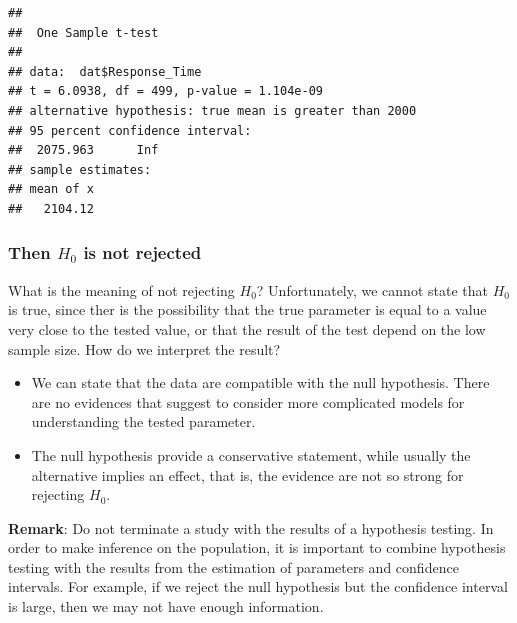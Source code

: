 \documentclass[
]{article}
\newenvironment{Shaded}{\begin{snugshade}}{\end{snugshade}}
\newcommand{\AttributeTok}[1]{\textcolor[rgb]{0.13,0.29,0.53}{#1}}
\newcommand{\DecValTok}[1]{\textcolor[rgb]{0.00,0.00,0.81}{#1}}
\newcommand{\FunctionTok}[1]{\textcolor[rgb]{0.13,0.29,0.53}{\textbf{#1}}}
\newcommand{\NormalTok}[1]{#1}
\newcommand{\SpecialCharTok}[1]{\textcolor[rgb]{0.81,0.36,0.00}{\textbf{#1}}}
\newcommand{\StringTok}[1]{\textcolor[rgb]{0.31,0.60,0.02}{#1}}
\providecommand{\tightlist}{%
  \setlength{\itemsep}{0pt}\setlength{\parskip}{0pt}}
\begin{document}
\begin{Shaded}
\end{Shaded}

\begin{verbatim}
## 
##  One Sample t-test
## 
## data:  dat$Response_Time
## t = 6.0938, df = 499, p-value = 1.104e-09
## alternative hypothesis: true mean is greater than 2000
## 95 percent confidence interval:
##  2075.963      Inf
## sample estimates:
## mean of x 
##   2104.12
\end{verbatim}

\hypertarget{then-h_0-is-not-rejected}{%
\subsubsection{\texorpdfstring{Then \(H_0\) is not
rejected}{Then H\_0 is not rejected}}\label{then-h_0-is-not-rejected}}

What is the meaning of not rejecting \(H_0\)? Unfortunately, we cannot
state that \(H_0\) is true, since ther is the possibility that the true
parameter is equal to a value very close to the tested value, or that
the result of the test depend on the low sample size. How do we
interpret the result?

\begin{itemize}
\tightlist
\item
  We can state that the data are compatible with the null hypothesis.
  There are no evidences that suggest to consider more complicated
  models for understanding the tested parameter.
\item
  The null hypothesis provide a conservative statement, while usually
  the alternative implies an effect, that is, the evidence are not so
  strong for rejecting \(H_0\).
\end{itemize}

\textbf{Remark}: Do not terminate a study with the results of a
hypothesis testing. In order to make inference on the population, it is
important to combine hypothesis testing with the results from the
estimation of parameters and confidence intervals. For example, if we
reject the null hypothesis but the confidence interval is large, then we
may not have enough information.
\end{document}
